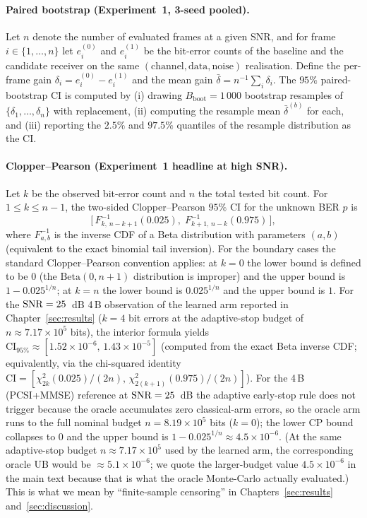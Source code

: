 \paragraph{Paired bootstrap (Experiment~1, 3-seed pooled).}
Let $n$ denote the number of evaluated frames at a given SNR, and for frame $i \in \{1, \dots, n\}$ let $e^{(0)}_i$ and $e^{(1)}_i$ be the bit-error counts of the baseline and the candidate receiver on the same $(\mathrm{channel}, \mathrm{data}, \mathrm{noise})$ realisation.
Define the per-frame gain $\delta_i = e^{(0)}_i - e^{(1)}_i$ and the mean gain $\bar{\delta} = n^{-1}\sum_i \delta_i$.
The $95\%$ paired-bootstrap CI is computed by (i) drawing $B_\text{boot} = 1\,000$ bootstrap resamples of $\{\delta_1, \dots, \delta_n\}$ with replacement, (ii) computing the resample mean $\bar{\delta}^{(b)}$ for each, and (iii) reporting the $2.5\%$ and $97.5\%$ quantiles of the resample distribution as the CI.

\paragraph{Clopper--Pearson (Experiment~1 headline at high SNR).}
Let $k$ be the observed bit-error count and $n$ the total tested bit count.
For $1 \leq k \leq n-1$, the two-sided Clopper--Pearson $95\%$ CI for the unknown BER $p$ is
\begin{equation*}
\bigl[\, F^{-1}_{k,\, n-k+1}(0.025),\; F^{-1}_{k+1,\, n-k}(0.975)\,\bigr],
\end{equation*}
where $F^{-1}_{a, b}$ is the inverse CDF of a Beta distribution with parameters $(a, b)$ (equivalent to the exact binomial tail inversion).
For the boundary cases the standard Clopper--Pearson convention applies: at $k = 0$ the lower bound is defined to be $0$ (the $\mathrm{Beta}(0, n+1)$ distribution is improper) and the upper bound is $1 - 0.025^{1/n}$; at $k = n$ the lower bound is $0.025^{1/n}$ and the upper bound is $1$.
For the $\mathrm{SNR} = 25$~dB 4\,B observation of the learned arm reported in Chapter~\ref{sec:results} ($k = 4$ bit errors at the adaptive-stop budget of $n \approx 7.17 \times 10^{5}$ bits), the interior formula yields $\mathrm{CI}_{95\%} \approx [1.52 \times 10^{-6},\, 1.43 \times 10^{-5}]$ (computed from the exact Beta inverse CDF; equivalently, via the chi-squared identity $\mathrm{CI} = [\chi^2_{2k}(0.025)/(2n),\, \chi^2_{2(k+1)}(0.975)/(2n)]$).
For the 4\,B \Oracle{} (PCSI+MMSE) reference at $\mathrm{SNR} = 25$~dB the adaptive early-stop rule does not trigger because the oracle accumulates zero classical-arm errors, so the oracle arm runs to the full nominal budget $n = 8.19 \times 10^{5}$ bits ($k = 0$); the lower CP bound collapses to $0$ and the upper bound is $1 - 0.025^{1/n} \approx 4.5 \times 10^{-6}$. (At the same adaptive-stop budget $n \approx 7.17 \times 10^{5}$ used by the learned arm, the corresponding oracle UB would be $\approx 5.1 \times 10^{-6}$; we quote the larger-budget value $4.5 \times 10^{-6}$ in the main text because that is what the oracle Monte-Carlo actually evaluated.) This is what we mean by ``finite-sample censoring'' in Chapters~\ref{sec:results} and~\ref{sec:discussion}.

